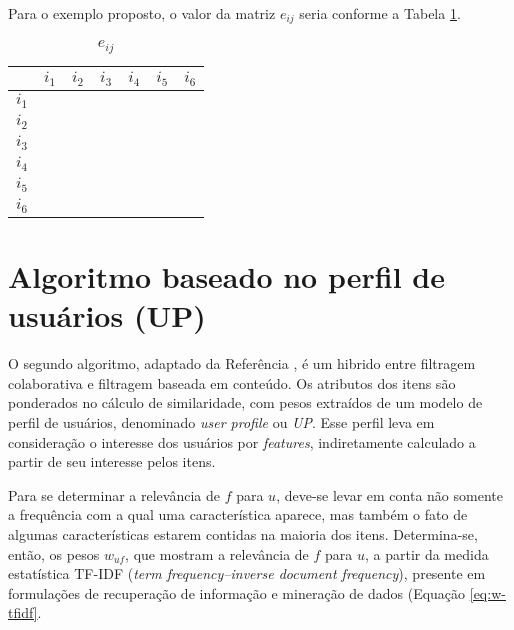 Para o exemplo proposto, o valor da matriz $e_{ij}$ seria conforme a Tabela \ref{tab:eij_fw}.

\begin{table}[H]
\begin{center}
    \caption{$e_{ij}$}
    \label{tab:eij_fw}
    \begin{tabular}{ | c | c | c | c | c | c | c | } 
    \hline
     & $i_1$ & $i_2$ & $i_3$ & $i_4$ & $i_5$ & $i_6$  \\ \hline
     $i_1$ &  &  &  & & &  \\ \hline
     $i_2$ &  &  &  & & &  \\ \hline
     $i_3$ &  &  &  & & &  \\ \hline
     $i_4$ &  &  &  & & &  \\ \hline
     $i_5$ &  &  &  & & &  \\ \hline
     $i_6$ &  &  &  & & &  \\ \hline
    \end{tabular}
\end{center}
\end{table}

\section{Algoritmo baseado no perfil de usuários (UP)} %
\label{sec:algoritmo_baseado_no_perfil_de_usu_rios_}


O segundo algoritmo, adaptado da Referência , é um hibrido entre filtragem colaborativa e filtragem baseada em conteúdo. Os atributos dos itens são ponderados no cálculo de similaridade, com pesos extraídos de um modelo de perfil de usuários, denominado \textit{user profile} ou \textit{UP}. Esse perfil leva em consideração o interesse dos usuários por \textit{features}, indiretamente calculado a partir de seu interesse pelos itens. 

Para se determinar a relevância de $f$ para $u$, deve-se levar em conta não somente a frequência com a qual uma característica aparece, mas também o fato de algumas características estarem contidas na maioria dos itens. Determina-se, então, os pesos $w_{uf}$, que mostram a relevância de $f$ para $u$, a partir da medida estatística TF-IDF (\textit{term frequency--inverse document frequency}), presente em formulações de recuperação de informação e mineração de dados (Equação \ref{eq:w-tfidf}. 

